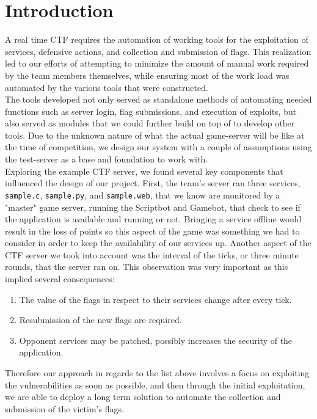 \documentclass[12pt]{report}
\begin{document}
\section*{Introduction}
A real time CTF requires the automation of working tools for the exploitation of services, defensive actions, and collection and submission of flags. This realization led to our efforts of attempting to minimize the amount of manual work required by the team members themselves, while ensuring most of the work load was automated by the various tools that were constructed. \\

The tools developed not only served as standalone methods of automating needed functions such as server login, flag submissions, and execution of exploits, but also served as modules that we could further build on top of to develop other tools. Due to the unknown nature of what the actual game-server will be like at the time of competition, we design our system with a couple of assumptions using the test-server as a base and foundation to work with. \\

Exploring the example CTF server, we found several key components that influenced the design of our project. First, the team's server ran three services, \texttt{sample.c}, \texttt{sample.py}, and \texttt{sample.web}, that we know are monitored by a "master" game server, running the Scriptbot and Gamebot, that check to see if the application is available and running or not. Bringing a service offline would result in the loss of points so this aspect of the game was something we had to consider in order to keep the availability of our services up. Another aspect of the CTF server we took into account was the interval of the ticks, or three minute rounds, that the server ran on. This observation was very important as this implied several consequences: \\

\begin{enumerate}
	\item The value of the flags in respect to their services change after every tick.
	\item Resubmission of the new flags are required.
	\item Opponent services may be patched, possibly increases the security of the application.
	
\end{enumerate}
Therefore our approach in regards to the list above involves a focus on exploiting the vulnerabilities as soon as possible, and then through the initial exploitation, we are able to deploy a long term solution to automate the collection and submission of the victim's flags. \\
\end{document}
